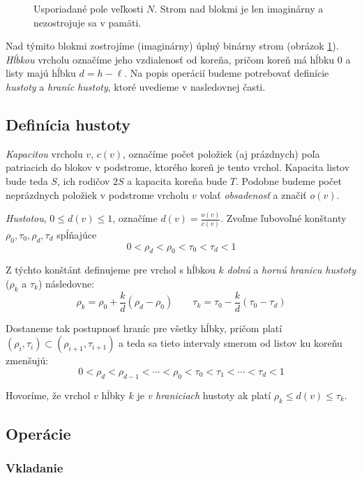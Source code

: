 \begin{figure}
    \centering
    \resizebox{0.8\textwidth}{!}{
        
    }
    \caption[Usporiadané pole]{Usporiadané pole veľkosti $N$. Strom nad blokmi je len imaginárny a nezostrojuje sa v pamäti.}
    \label{fig:of_overview}
\end{figure}

Nad týmito blokmi zostrojíme (imaginárny) úplný binárny strom (obrázok \ref{fig:of_overview}). \emph{Hĺbkou} vrcholu označíme jeho vzdialenosť od koreňa, pričom koreň má hĺbku $0$ a listy majú hĺbku $d = h-\ell$. Na popis operácií budeme potrebovať definície \emph{hustoty} a \emph{hraníc hustoty}, ktoré uvedieme v nasledovnej časti.

\subsection{Definícia hustoty}

\emph{Kapacitou} vrcholu $v$, $c(v)$, označíme počet položiek (aj prázdnych) poľa patriacich do blokov v podstrome, ktorého koreň je tento vrchol. Kapacita listov bude teda $S$, ich rodičov $2S$ a kapacita koreňa bude $T$. Podobne budeme počet neprázdnych položiek v podstrome vrcholu $v$ volať \emph{obsadenosť} a značiť $o(v)$. 

\emph{Hustotou}, $0 \le d(v) \le 1$, označíme $d(v) = \frac{o(v)}{c(v)}$. Zvoľme ľubovoľné konštanty $\rho_0, \tau_0, \rho_d, \tau_d$ spĺňajúce
\[
0 < \rho_d < \rho_0 < \tau_0 < \tau_d < 1
\]

Z týchto konštánt definujeme pre vrchol s hĺbkou $k$ \emph{dolnú} a \emph{hornú hranicu hustoty} ($\rho_k$ a $\tau_k$) následovne:
\[
\rho_k = \rho_0 + \frac{k}{d}(\rho_d-\rho_0) \qquad
\tau_k = \tau_0 - \frac{k}{d}(\tau_0-\tau_d)
\]

Dostaneme tak postupnosť hraníc pre všetky hĺbky, pričom platí $(\rho_i,\tau_i) \subset (\rho_{i+1},\tau_{i+1})$ a teda sa tieto intervaly smerom od listov ku koreňu zmenšujú:
\[
0 < \rho_d < \rho_{d-1} < \cdots < \rho_0 < \tau_0 < \tau_1 < \cdots < \tau_d < 1
\]

Hovoríme, že vrchol $v$ hĺbky $k$ je \emph{v hraniciach} hustoty ak platí $\rho_k \le d(v) \le \tau_k$.

\subsection{Operácie}
\subsubsection{Vkladanie}


